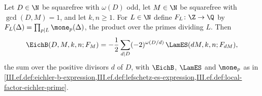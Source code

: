 Let $D\in\N$ be squarefree with $\omega(D)$ odd, let $M\in\N$ be squarefree with $\gcd(D,M)=1$, and let $k,n\ge1$. For $L\in\N$ define
$F_L\colon\Z\to\Q$ by $F_L(\Delta)=\prod_{p\mid L}\mone_p(\Delta)$, the product over the primes dividing $L$. Then
\[
  \EichB(D,M,k,n;F_M)=-\frac12\sum_{d\mid D}(-2)^{\omega(D/d)}\,\LamES(dM,k,n;F_{dM}),
\]
the sum over the positive divisors $d$ of $D$, with $\EichB$, $\LamES$ and $\mone_p$ as in
\cref{III.ef.def:eichler-b-expression,III.ef.def:lefschetz-es-expression,III.ef.def:local-factor-eichler-prime}.

